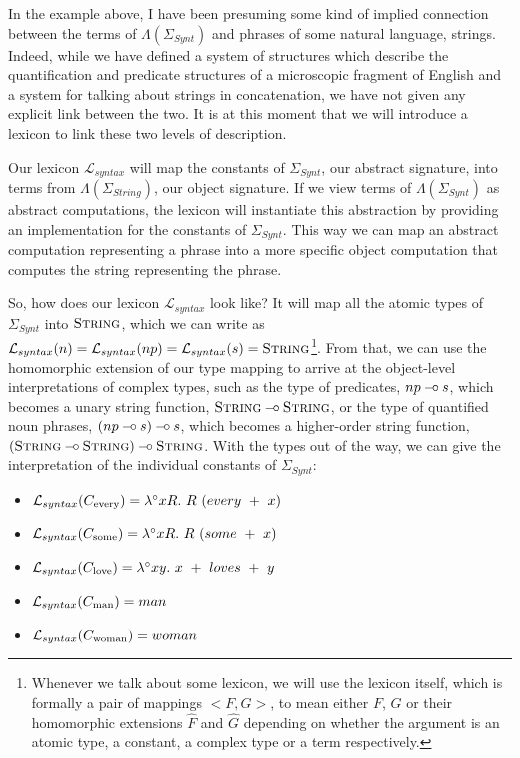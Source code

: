 In the example above, I have been presuming some kind of implied
connection between the terms of $\Lambda(\Sigma_{Synt})$ and phrases of
some natural language, strings. Indeed, while we have defined a system
of structures which describe the quantification and predicate structures
of a microscopic fragment of English and a system for talking about
strings in concatenation, we have not given any explicit link between
the two. It is at this moment that we will introduce a lexicon to link
these two levels of description.

Our lexicon $\mathcal{L}_{syntax}$ will map the constants of
$\Sigma_{Synt}$, our abstract signature, into terms from
$\Lambda(\Sigma_{String})$, our object signature. If we view terms of
$\Lambda(\Sigma_{Synt})$ as abstract computations, the lexicon will
instantiate this abstraction by providing an implementation for the
constants of $\Sigma_{Synt}$. This way we can map an abstract
computation representing a phrase into a more specific object
computation that computes the string representing the phrase.

So, how does our lexicon $\mathcal{L}_{syntax}$ look like? It will map
all the atomic types of $\Sigma_{Synt}$ into $\textsc{String}$, which we
can write as $\mathcal{L}_{syntax}(n) = \mathcal{L}_{syntax}(np) =
\mathcal{L}_{syntax}(s) = \textsc{String}$\footnote{Whenever we talk
  about some lexicon, we will use the lexicon itself, which is formally
  a pair of mappings $\mathopen{<}F, G\mathclose{>}$, to mean either
  $F$, $G$ or their homomorphic extensions $\hat{F}$ and $\hat{G}$
  depending on whether the argument is an atomic type, a constant, a
  complex type or a term respectively.}. From that, we can use the
homomorphic extension of our type mapping to arrive at the object-level
interpretations of complex types, such as the type of predicates, $np
\mathbin{{-}\mkern-3.5mu{\circ}} s$, which becomes a unary string function, $\textsc{String} \mathbin{{-}\mkern-3.5mu{\circ}}
\textsc{String}$, or the type of quantified noun phrases, $(np \mathbin{{-}\mkern-3.5mu{\circ}} s)
\mathbin{{-}\mkern-3.5mu{\circ}} s$, which becomes a higher-order string function,
$(\textsc{String} \mathbin{{-}\mkern-3.5mu{\circ}} \textsc{String}) \mathbin{{-}\mkern-3.5mu{\circ}} \textsc{String}$. With
the types out of the way, we can give the interpretation of the
individual constants of $\Sigma_{Synt}$:
\begin{itemize}
\item $\mathcal{L}_{syntax}(C_{\textrm{every}}) = \lambda^{\circ} x
  R.\ R\ (every\ +\ x)$
\item $\mathcal{L}_{syntax}(C_{\textrm{some}}) = \lambda^{\circ} x
  R.\ R\ (some\ +\ x)$
\item $\mathcal{L}_{syntax}(C_{\textrm{love}}) = \lambda^{\circ} x
  y.\ x\ +\ loves\ +\ y$
\item $\mathcal{L}_{syntax}(C_{\textrm{man}}) = man$
\item $\mathcal{L}_{syntax}(C_{\textrm{woman}}) = woman$
\end{itemize}

